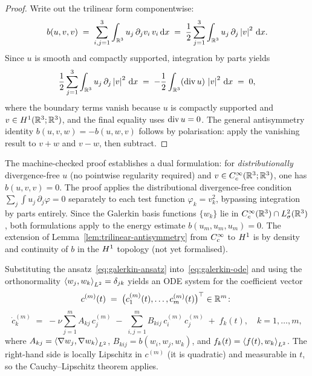 \begin{proof}
  Write out the trilinear form componentwise:
  \[
    b(u, v, v)
    \;=\;
    \sum_{i,j=1}^{3} \int_{\mathbb{R}^{3}} u_{j}\,\partial_{j} v_{i}\,v_{i} \,\mathrm{d} x
    \;=\;
    \frac{1}{2} \sum_{j=1}^{3} \int_{\mathbb{R}^{3}} u_{j}\,\partial_{j}\left\lvert v \right\rvert^{2} \,\mathrm{d} x.
  \]
  Since $u$ is smooth and compactly supported, integration by parts yields
  \[
    \frac{1}{2} \sum_{j=1}^{3} \int_{\mathbb{R}^{3}} u_{j}\,\partial_{j}\left\lvert v \right\rvert^{2} \,\mathrm{d} x
    \;=\;
    -\frac{1}{2} \int_{\mathbb{R}^{3}} (\operatorname{div} u)\,\left\lvert v \right\rvert^{2} \,\mathrm{d} x
    \;=\;
    0,
  \]
  where the boundary terms vanish because $u$ is compactly supported and
  $v \in H^{1}(\mathbb{R}^{3}; \mathbb{R}^{3})$, and the final equality uses
  $\operatorname{div} u = 0$.  The general antisymmetry identity $b(u, v, w) = -b(u, w, v)$
  follows by polarisation: apply the vanishing result to $v + w$ and $v - w$,
  then subtract.
\end{proof}

\begin{remark}\label{rem:trilinear-lean}
  The machine-checked proof establishes a dual formulation: for
  \emph{distributionally} divergence-free $u$ (no pointwise regularity required)
  and $v \in C^\infty_c(\mathbb{R}^{3}; \mathbb{R}^{3})$, one has $b(u, v, v) = 0$.  The proof
  applies the distributional divergence-free condition
  $\sum_{j} \int u_{j}\,\partial_{j}\varphi = 0$ separately to each test function
  $\varphi_{k} = v_{k}^{2}$, bypassing integration by parts entirely.
  Since the Galerkin basis functions $\{w_{k}\}$ lie in
  $C^\infty_c(\mathbb{R}^{3}) \cap L^{2}_\sigma(\mathbb{R}^{3})$, both formulations apply to the energy
  estimate $b(u_{m}, u_{m}, u_{m}) = 0$.  The extension of
  Lemma~\ref{lem:trilinear-antisymmetry} from $C^\infty_c$ to $H^{1}$ is by
  density and continuity of $b$ in the $H^{1}$ topology (not yet formalised).
\end{remark}

Substituting the ansatz~\eqref{eq:galerkin-ansatz} into~\eqref{eq:galerkin-ode}
and using the orthonormality $\left\langle w_{j}, w_{k} \right\rangle_{L^{2}} = \delta_{jk}$ yields an
ODE system for the coefficient vector
\[
  c^{(m)}(t)
  \;=\;
  \bigl(c_{1}^{(m)}(t), \ldots, c_{m}^{(m)}(t)\bigr)^{\top}
  \in \mathbb{R}^{m}\colon
\]
\[
  \dot{c}_{k}^{(m)}
  \;=\;
  -\nu \sum_{j=1}^{m} A_{kj}\,c_{j}^{(m)}
  \;-\;
  \sum_{i,j=1}^{m} B_{kij}\,c_{i}^{(m)}\,c_{j}^{(m)}
  \;+\;
  f_{k}(t),
  \quad
  k = 1, \ldots, m,
\]
where $A_{kj} = \left\langle \nabla w_{j}, \nabla w_{k} \right\rangle_{L^{2}}$,
$B_{kij} = b(w_{i}, w_{j}, w_{k})$, and
$f_{k}(t) = \left\langle f(t), w_{k} \right\rangle_{L^{2}}$.  The right-hand side is locally Lipschitz
in $c^{(m)}$ (it is quadratic) and measurable in $t$, so the Cauchy--Lipschitz
theorem applies.


